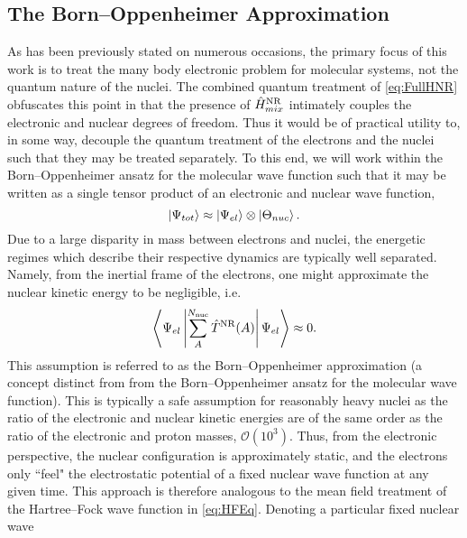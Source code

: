 \subsection{The Born--Oppenheimer Approximation}
\label{sec:BornOpp}

As has been previously stated on numerous occasions, the primary focus of this work is to treat the many body
electronic problem for molecular systems, not the quantum nature of the nuclei. The combined quantum treatment
of \cref{eq:FullHNR} obfuscates this point in that the presence of $\hat{H}^{\mathrm{NR}}_{mix}$ intimately couples the
electronic and nuclear degrees of freedom. Thus it would be of practical utility to, in some way, decouple
the quantum treatment of the electrons and the nuclei such that they may be treated separately. 
To this end, we will work within the Born--Oppenheimer ansatz for the molecular wave function \cite{Oppenheimer27_457,Tully98_407} such
that it may be written as a single tensor product of an electronic and nuclear wave function,
\begin{equation}
  \left\vert \Psi_{tot} \right\rangle \approx \left\vert \Psi_{el} \right\rangle \otimes \left\vert \Theta_{nuc} \right\rangle.
\end{equation}
Due to a large disparity in mass between electrons and nuclei, the energetic regimes which describe their respective
dynamics are typically well separated. Namely, from the inertial frame of the electrons, one might approximate
the nuclear kinetic energy to be negligible, i.e.
\begin{equation}
\left\langle \Psi_{el} \left\vert \sum_A^{N_\mathrm{nuc}} \hat{T}^{\mathrm{NR}}(A)  \right\vert \Psi_{el} \right\rangle \approx 0.
\end{equation}
This assumption is referred to as the Born--Oppenheimer approximation (a concept distinct from from the 
Born--Oppenheimer ansatz for the molecular wave function). This is typically a safe assumption for reasonably
heavy nuclei as the ratio of the electronic and nuclear kinetic energies are of the same order as
the ratio of the electronic and proton masses, $\mathcal{O}(10^{3})$. Thus, from the electronic perspective,
the nuclear configuration is approximately static, and the electrons only ``feel" the electrostatic
potential of a fixed nuclear wave function at any given time. This approach is therefore analogous to
the mean field treatment of the Hartree--Fock wave function in \cref{eq:HFEq}. Denoting a particular fixed nuclear wave
